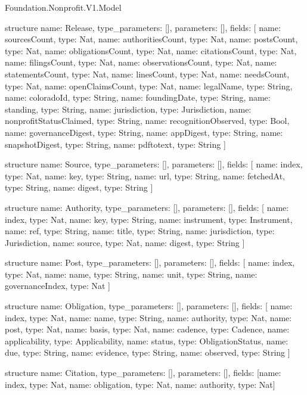 \begin{lexlean}{Foundation.Nonprofit.V1.Model}
\begin{semanticmodule}
structure{
  name: Release,
  type_parameters: [],
  parameters: [],
  fields: [
    {name: sourcesCount, type: Nat},
    {name: authoritiesCount, type: Nat},
    {name: postsCount, type: Nat},
    {name: obligationsCount, type: Nat},
    {name: citationsCount, type: Nat},
    {name: filingsCount, type: Nat},
    {name: observationsCount, type: Nat},
    {name: statementsCount, type: Nat},
    {name: linesCount, type: Nat},
    {name: needsCount, type: Nat},
    {name: openClaimsCount, type: Nat},
    {name: legalName, type: String},
    {name: coloradoId, type: String},
    {name: foundingDate, type: String},
    {name: standing, type: String},
    {name: jurisdiction, type: Jurisdiction},
    {name: nonprofitStatusClaimed, type: String},
    {name: recognitionObserved, type: Bool},
    {name: governanceDigest, type: String},
    {name: appDigest, type: String},
    {name: snapshotDigest, type: String},
    {name: pdftotext, type: String}
  ]
}

structure{
  name: Source,
  type_parameters: [],
  parameters: [],
  fields: [
    {name: index, type: Nat},
    {name: key, type: String},
    {name: url, type: String},
    {name: fetchedAt, type: String},
    {name: digest, type: String}
  ]
}

structure{
  name: Authority,
  type_parameters: [],
  parameters: [],
  fields: [
    {name: index, type: Nat},
    {name: key, type: String},
    {name: instrument, type: Instrument},
    {name: ref, type: String},
    {name: title, type: String},
    {name: jurisdiction, type: Jurisdiction},
    {name: source, type: Nat},
    {name: digest, type: String}
  ]
}

structure{
  name: Post,
  type_parameters: [],
  parameters: [],
  fields: [
    {name: index, type: Nat},
    {name: name, type: String},
    {name: unit, type: String},
    {name: governanceIndex, type: Nat}
  ]
}

structure{
  name: Obligation,
  type_parameters: [],
  parameters: [],
  fields: [
    {name: index, type: Nat},
    {name: name, type: String},
    {name: authority, type: Nat},
    {name: post, type: Nat},
    {name: basis, type: Nat},
    {name: cadence, type: Cadence},
    {name: applicability, type: Applicability},
    {name: status, type: ObligationStatus},
    {name: due, type: String},
    {name: evidence, type: String},
    {name: observed, type: String}
  ]
}

structure{
  name: Citation,
  type_parameters: [],
  parameters: [],
  fields: [{name: index, type: Nat}, {name: obligation, type: Nat}, {name: authority, type: Nat}]
}


\end{semanticmodule}
\end{lexlean}
